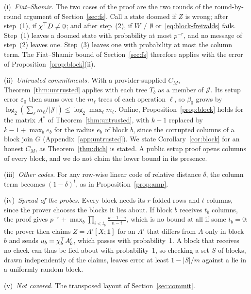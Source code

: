 \begin{remark}
\label{rem:block-scope}
(i)~\emph{Fiat--Shamir.} The two cases of the proof are the two rounds of the round-by-round argument
of Section~\ref{sec:fs}. Call a state doomed if $Z$ is wrong; after step~(1), if $\chi^\top D\neq0$;
and after step~(2), if $W\neq\emptyset$ or~\eqref{eq:block-freivalds} fails. Step~(1) leaves a doomed
state with probability at most $p^{-r}$, and no message of step~(2) leaves one. Step~(3) leaves one
with probability at most the column term. The Fiat--Shamir bound of Section~\ref{sec:fs} therefore
applies with the error of Proposition~\ref{prop:block}(ii).

(ii)~\emph{Untrusted commitments.} With a provider-supplied $C_M$, Theorem~\ref{thm:untrusted}
applies with each tree $T_b$ as a member of $\mathcal J$. Its setup error $\varepsilon_0$ then sums
over the $m_\ell$ trees of each operation $\ell$, so $\beta_0$ grows by
$\log_2(\sum_\ell m_\ell/|\mathcal J|)\le\log_2\max_\ell m_\ell$. Online,
Proposition~\ref{prop:block} holds for the matrix $A^*$ of Theorem~\ref{thm:untrusted}, with $k-1$
replaced by $k-1+\max_be_b$ for the radius $e_b$ of block $b$, since the corrupted columns of a block
join $G$ (Appendix~\ref{app:untrusted}). We state Corollary~\ref{cor:block} for an honest $C_M$, as
Theorem~\ref{thm:dich} is stated. A public setup proof opens columns of every block, and we do not
claim the lower bound in its presence.

(iii)~\emph{Other codes.} For any row-wise linear code of relative distance $\delta$, the column term
becomes $(1-\delta)^t$, as in Proposition~\ref{prop:amp}.

(iv)~\emph{Spread of the probes.} Every block needs its $r$ folded rows and $t$ columns, since the
prover chooses the blocks it lies about. If block $b$ receives $t_b$ columns, the proof gives
$p^{-r}+\max_b\prod_{i<t_b}\frac{k-1-i}{n-i}$, which is no bound at all if some $t_b=0$: the prover
then claims $Z=A'[X;\mathbf 1]$ for an $A'$ that differs from $A$ only in block $b$ and sends
$u_b=\chi_b^\top A'_b$, which passes with probability~1. A block that receives no check can thus be
lied about with probability~1, so checking a set $S$ of blocks, drawn independently of the claims,
leaves error at least $1-|S|/m$ against a lie in a uniformly random block.

(v)~\emph{Not covered.} The transposed layout of Section~\ref{sec:commit}.
\end{remark}

